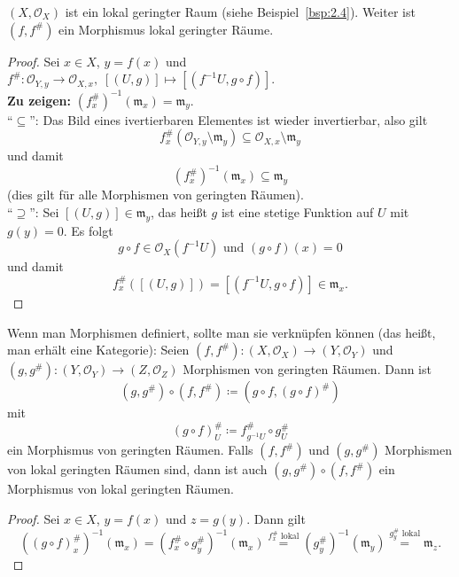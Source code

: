 \begin{bsp}
	$(X,\mathcal{O}_X)$ ist ein lokal geringter Raum (siehe Beispiel~\ref{bsp:2.4}). Weiter ist $(f,f^{\#})$ ein Morphismus lokal geringter Räume.
	\begin{proof}
		Sei $x \in X$, $y = f(x)$ und $f^{\#}\colon \mathcal{O}_{Y,y} \to \mathcal{O}_{X,x},\;[(U,g)]\mapsto [(f^{-1}U,g\circ f)]$.\\
		\textbf{Zu zeigen:} $(f^{\#}_x)^{-1}(\mathfrak{m}_x) = \mathfrak{m}_y$.\\
		\enquote{$\subseteq$}: Das Bild eines ivertierbaren Elementes ist wieder invertierbar, also gilt
		\[
			f^{\#}_x(\mathcal{O}_{Y,y}\setminus \mathfrak{m}_y) \subseteq \mathcal{O}_{X,x}\setminus \mathfrak{m}_y
		\]
		und damit
		\[
			(f_x^{\#})^{-1}(\mathfrak{m}_x) \subseteq \mathfrak{m}_y
		\]
		(dies gilt für alle Morphismen von geringten Räumen).\\
		\enquote{$\supseteq$}: Sei $[(U,g)]\in \mathfrak{m}_y$, das heißt $g$ ist eine stetige Funktion auf $U$ mit $g(y)=0$. Es folgt
		\[
			g \circ f \in \mathcal{O}_X(f^{-1}U) \text{ und } (g \circ f)(x)=0
		\]
		und damit
		\[
			f_x^{\#}([(U,g)]) = [(f^{-1}U,g\circ f)] \in \mathfrak{m}_x.
		\]
	\end{proof}
\end{bsp}

\begin{bem}
	Wenn man Morphismen definiert, sollte man sie verknüpfen können (das heißt, man erhält eine Kategorie): Seien $(f,f^{\#})\colon (X,\mathcal{O}_X) \to (Y,\mathcal{O}_Y)$ und $(g,g^{\#})\colon (Y,\mathcal{O}_Y) \to (Z,\mathcal{O}_Z)$ Morphismen von geringten Räumen. Dann ist
	\[
		(g,g^{\#}) \circ (f,f^{\#}) \coloneqq (g\circ f,(g\circ f)^{\#})
	\]
	mit
	\[
		(g\circ f)^{\#}_U \coloneqq f^{\#}_{g^{-1}U} \circ g^{\#}_U
	\]
	ein Morphismus von geringten Räumen. Falls $(f,f^{\#})$ und $(g,g^{\#})$ Morphismen von lokal geringten Räumen sind, dann ist auch $(g,g^{\#}) \circ (f,f^{\#})$ ein Morphismus von lokal geringten Räumen.
	\begin{proof}
		Sei $x \in X$, $y = f(x)$ und $z = g(y)$. Dann gilt
		\[
			((g\circ f)^{\#}_x)^{-1}(\mathfrak{m}_x) = (f^{\#}_x \circ g^{\#}_y)^{-1}(\mathfrak{m}_x) \overset{f^{\#}_x \text{ lokal}}{=} (g^{\#}_y)^{-1}(\mathfrak{m}_y) \overset{g^{\#}_y \text{ lokal}}{=} \mathfrak{m}_z.
		\]
	\end{proof}
\end{bem}

